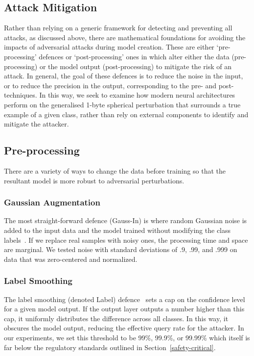 \subsection{Attack Mitigation}

Rather than relying on a generic framework for detecting and preventing all attacks, as discussed above, there are mathematical foundations for avoiding the impacts of adversarial attacks during model creation.
These are either `pre-processing' defences or `post-processing' ones in which alter either the data (pre-processing) or the model output (post-processing) to mitigate the risk of an attack.
In general, the goal of these defences is to reduce the noise in the input, or to reduce the precision in the output, corresponding to the pre- and post- techniques.
In this way, we seek to examine how modern neural architectures perform on the generalised 1-byte spherical perturbation that surrounds a true example of a given class, rather than rely on external components to identify and mitigate the attacker.


\subsection{Pre-processing}
\label{pre-processing}
There are a variety of ways to change the data before training so that the resultant model is more robust to adversarial perturbations.

\subsubsection{Gaussian Augmentation}
The most straight-forward defence (Gauss-In) is where random Gaussian noise is added to the input data and the model trained without modifying the class labels~\cite{gauss_aug}.
If we replace real samples with noisy ones, the processing time and space are marginal.
We tested noise with standard deviations of .9, .99, and .999 on data that was zero-centered and normalized.

\subsubsection{Label Smoothing}
The label smoothing (denoted Label) defence~\cite{label_smoothing} sets a cap on the confidence level for a given model output.
If the output layer outputs a number higher than this cap, it uniformly distributes the difference across all classes.
In this way, it obscures the model output, reducing the effective query rate for the attacker.
In our experiments, we set this threshold to be 99\%,  99.9\%,  or 99.99\% which itself is far below the regulatory standards outlined in Section~\ref{safety-critical}.

